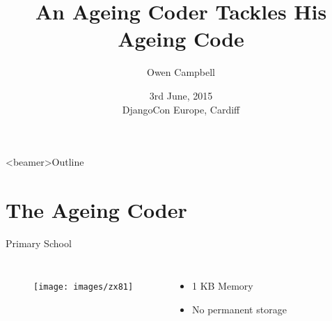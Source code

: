 \documentclass{beamer}
\title{An Ageing Coder Tackles His Ageing Code}
\author{Owen Campbell}
\date[DjangoCon Europe 2015]{3rd June, 2015\\DjangoCon Europe, Cardiff}
\begin{document}
\begin{frame}
  \titlepage{}
\end{frame}

{
  \begin{frame}<beamer>{Outline}
    \tableofcontents
  \end{frame}
}

\section{The Ageing Coder}

  \begin{frame}{Primary School}
    \begin{columns}
        \begin{figure}
          \texttt{[image: images/zx81]}
        \end{figure}
        \begin{itemize}
          \item 1 KB Memory
          \item No permanent storage
        \end{itemize}
    \end{columns}
  \end{frame}
\end{document}
